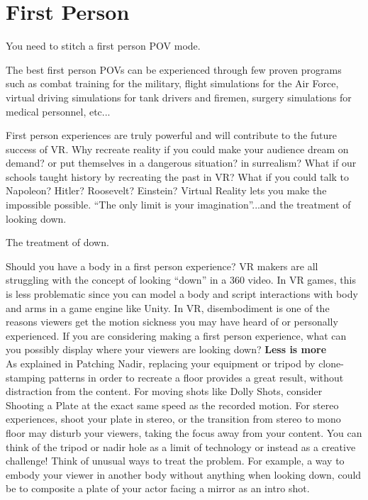 \chapter{First Person}
\pagecolor{white}
\label{chap:44}
\begin{fullwidth}

\problem

{\large You need to stitch a first person POV mode. \par}

The best first person POVs can be experienced through few proven programs such as combat training for the military, flight simulations for the Air Force, virtual driving simulations for tank drivers and firemen, surgery simulations for medical personnel, etc... 

First person experiences are truly powerful and will contribute to the future success of VR. Why recreate reality if you could make your audience dream on demand? or put themselves in a dangerous situation? in surrealism? What if our schools taught history by recreating the past in VR? What if you could talk to Napoleon? Hitler? Roosevelt? Einstein? Virtual Reality lets you make the impossible possible. “The only limit is your imagination”...and the treatment of looking down.

\solution

{\large The treatment of down. \par}

Should you have a body in a first person experience? VR makers are all struggling with the concept of looking “down” in a 360 video. In VR games, this is less problematic since you can model a body and script interactions with body and arms in a game engine like Unity. In VR, disembodiment is one of the reasons viewers get the motion sickness you may have heard of or personally experienced. If you are considering making a first person experience, what can you possibly display where your viewers are looking down? 
\clearpage
{\bfseries Less is more}
\\
As explained in Patching Nadir, replacing your equipment or tripod by clone-stamping patterns in order to recreate a floor provides a great result, without distraction from the content. For moving shots like Dolly Shots, consider Shooting a Plate at the exact same speed as the recorded motion. For stereo experiences, shoot your plate in stereo, or the transition from stereo to mono floor may disturb your viewers, taking the focus away from your content. You can think of the tripod or nadir hole as a limit of technology or instead as a creative challenge! Think of unusual ways to treat the problem. For example, a way to embody your viewer in another body without anything when looking down, could be to composite a plate of your actor facing a mirror as an intro shot.


\end{fullwidth}
